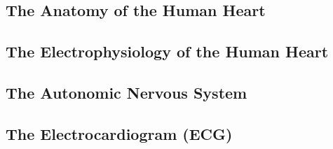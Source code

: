 \subsection{The Anatomy of the Human Heart}
\label{anatomy}



\subsection{The Electrophysiology of the Human Heart}
\label{physiology}



\subsection{The Autonomic Nervous System}
\label{ans}



\subsection{The Electrocardiogram (ECG)}
\label{ecg}
